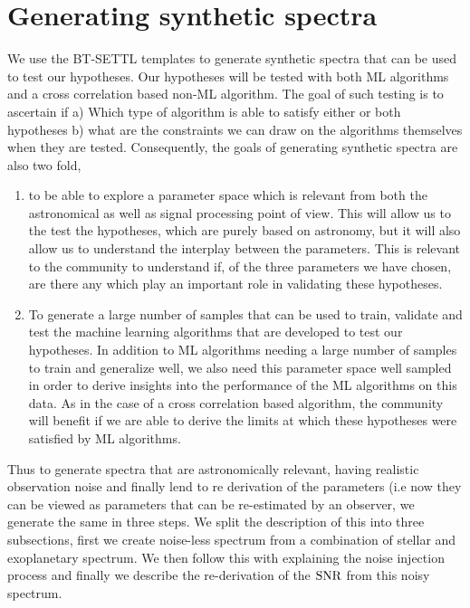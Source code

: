  \section{Generating synthetic spectra}
We use the \textsc{BT-SETTL} templates to generate synthetic spectra that can be used to test our hypotheses.
Our hypotheses will be tested with both ML algorithms and a cross correlation based non-ML algorithm.
The goal of such testing is to ascertain if a) Which type of algorithm is able to satisfy either or both hypotheses b) what are the constraints we can draw on the algorithms themselves when they are tested.
Consequently, the goals of generating synthetic spectra are also two fold, 
\begin{enumerate}
    \item to be able to explore a parameter space which is relevant from both the astronomical as well as signal processing point of view.
    This will allow us to the test the hypotheses, which are purely based on astronomy, but it will also allow us to understand the interplay between the parameters.
    This is relevant to the community to understand if, of the three parameters we have chosen, are there any which play an important role in validating these hypotheses.
    \item To generate a large number of samples that can be used to train, validate and test the machine learning algorithms that are developed to test our hypotheses.
    In addition to ML algorithms needing a large number of samples to train and generalize well, we also need this parameter space well sampled in order to derive insights into the performance of the ML algorithms on this data.
    As in the case of a cross correlation based algorithm, the community will benefit if we are able to derive the limits at which these hypotheses were satisfied by ML algorithms.
\end{enumerate}
Thus to generate spectra that are astronomically relevant, having realistic observation noise and finally lend to re derivation of the parameters (i.e now they can be viewed as parameters that can be re-estimated by an observer, we generate the same in three steps.
We split the description of this into three subsections, first we create noise-less spectrum from a combination of stellar and exoplanetary spectrum.
We then follow this with explaining the noise injection process and finally we describe the re-derivation of the $\rm{SNR}$ from this noisy spectrum.
